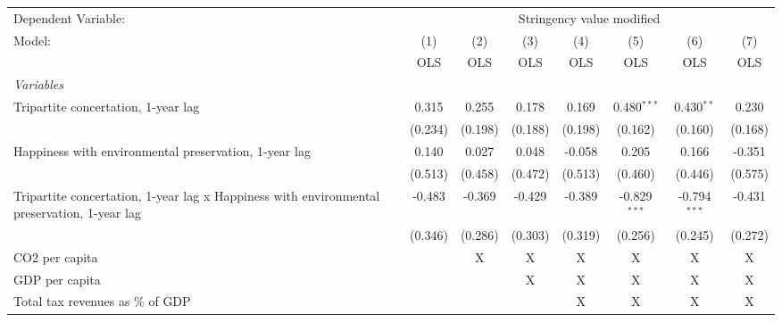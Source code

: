 
\begingroup
\centering
\begin{tabular}{lccccccc}
   \toprule
   Dependent Variable: & \multicolumn{7}{c}{Stringency value modified}\\
   Model:                                                                                      & (1)     & (2)     & (3)     & (4)     & (5)            & (6)            & (7)\\  
                                                                                               &  OLS    & OLS     & OLS     & OLS     & OLS            & OLS            & OLS\\  
   \midrule
   \emph{Variables}\\
   Tripartite concertation, 1-year lag                                                         & 0.315   & 0.255   & 0.178   & 0.169   & 0.480$^{***}$  & 0.430$^{**}$   & 0.230\\   
                                                                                               & (0.234) & (0.198) & (0.188) & (0.198) & (0.162)        & (0.160)        & (0.168)\\   
   Happiness with environmental preservation, 1-year lag                                       & 0.140   & 0.027   & 0.048   & -0.058  & 0.205          & 0.166          & -0.351\\   
                                                                                               & (0.513) & (0.458) & (0.472) & (0.513) & (0.460)        & (0.446)        & (0.575)\\   
   Tripartite concertation, 1-year lag x Happiness with environmental preservation, 1-year lag & -0.483  & -0.369  & -0.429  & -0.389  & -0.829$^{***}$ & -0.794$^{***}$ & -0.431\\   
                                                                                               & (0.346) & (0.286) & (0.303) & (0.319) & (0.256)        & (0.245)        & (0.272)\\   
   CO2 per capita                                                                              &         & X       & X       & X       & X              & X              & X\\  
   GDP per capita                                                                              &         &         & X       & X       & X              & X              & X\\  
   Total tax revenues as \% of GDP                                                             &         &         &         & X       & X              & X              & X\\  

\end{tabular}
